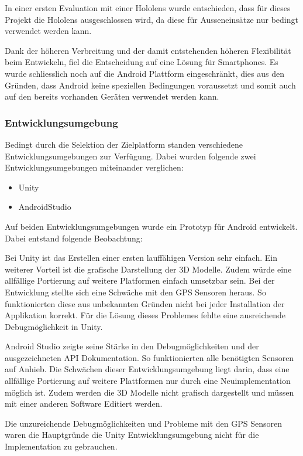 \documentclass[a4paper]{scrreprt}
\begin{document}
In einer ersten Evaluation mit einer Hololens wurde entschieden, dass für dieses Projekt die Hololens ausgeschlossen wird, da diese für Ausseneinsätze nur bedingt verwendet werden kann.

Dank der höheren Verbreitung und der damit entstehenden höheren Flexibilität beim Entwickeln, fiel die Entscheidung auf eine Lösung für Smartphones. Es wurde schliesslich noch auf die Android Plattform eingeschränkt, dies aus den Gründen, dass Android keine speziellen Bedingungen voraussetzt und somit auch auf den bereits vorhanden Geräten verwendet werden kann.

\subsubsection{Entwicklungsumgebung}
\label{ssec:EvalPlattform}
Bedingt durch die Selektion der Zielplatform standen verschiedene Entwicklungsumgebungen zur Verfügung. Dabei wurden folgende zwei Entwicklungsumgebungen miteinander verglichen:
\begin{itemize}
\item Unity
\item AndroidStudio
\end{itemize}

Auf beiden Entwicklungsumgebungen wurde ein Prototyp für Android entwickelt. Dabei entstand folgende Beobachtung:

Bei Unity ist das Erstellen einer ersten lauffähigen Version sehr einfach. Ein weiterer Vorteil ist die grafische Darstellung der 3D Modelle. Zudem würde eine allfällige Portierung auf weitere Platformen einfach umsetzbar sein. Bei der Entwicklung stellte sich eine Schwäche mit den GPS Sensoren heraus. So funktionierten diese aus unbekannten Gründen nicht bei jeder Installation der Applikation korrekt. Für die Lösung dieses Problemes fehlte eine ausreichende Debugmöglichkeit in Unity.

Android Studio zeigte seine Stärke in den Debugmöglichkeiten und der ausgezeichneten API Dokumentation. So funktionierten alle benötigten Sensoren auf Anhieb. Die Schwächen dieser Entwicklungsumgebung liegt darin, dass eine allfällige Portierung auf weitere Plattformen nur durch eine Neuimplementation möglich ist. Zudem werden die 3D Modelle nicht grafisch dargestellt und müssen mit einer anderen Software Editiert werden.

Die unzureichende Debugmöglichkeiten und Probleme mit den GPS Sensoren waren die Hauptgründe die Unity Entwicklungsumgebung nicht für die Implementation zu gebrauchen.
\end{document}
